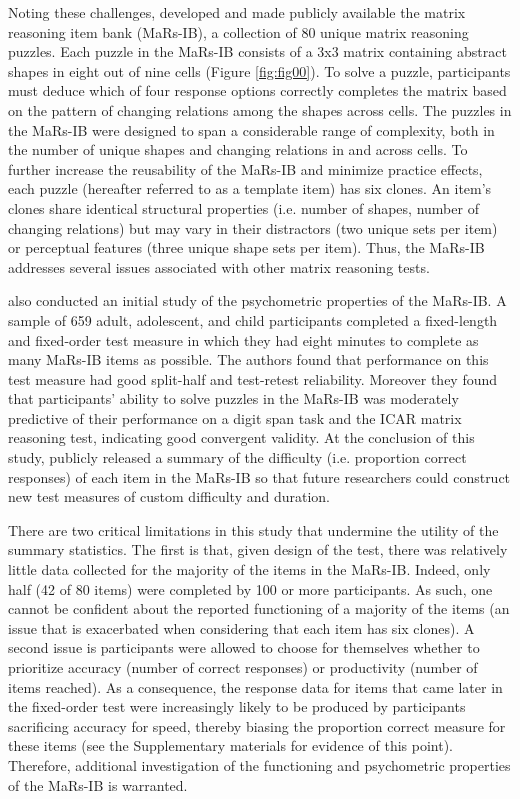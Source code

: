 \documentclass[a4paper,man,natbib]{apa6}
\begin{document}
Noting these challenges, \cite{knoll2016window} developed and  \cite{chierchia2019matrix} made publicly available the matrix reasoning item bank (MaRs-IB), a collection of 80 unique matrix reasoning puzzles. Each puzzle in the MaRs-IB consists of a 3x3 matrix containing abstract shapes in eight out of nine cells (Figure \ref{fig:fig00}). To solve a puzzle, participants must deduce which of four response options correctly completes the matrix based on the pattern of changing relations among the shapes across cells. The puzzles in the MaRs-IB were designed to span a considerable range of complexity, both in the number of unique shapes and changing relations in and across cells. To further increase the reusability of the MaRs-IB and minimize practice effects, each puzzle (hereafter referred to as a template item) has six clones. An item's clones share identical structural properties (i.e. number of shapes, number of changing relations) but may vary in their distractors (two unique sets per item) or perceptual features (three unique shape sets per item). Thus, the MaRs-IB addresses several issues associated with other matrix reasoning tests.   

\cite{chierchia2019matrix} also conducted an initial study of the psychometric properties of the MaRs-IB. A sample of 659 adult, adolescent, and child participants completed a fixed-length and fixed-order test measure in which they had eight minutes to complete as many MaRs-IB items as possible. The authors found that performance on this test measure had good split-half and test-retest reliability. Moreover they found that participants' ability to solve puzzles in the MaRs-IB was moderately predictive of their performance on a digit span task and the ICAR matrix reasoning test, indicating good convergent validity. At the conclusion of this study, \cite{chierchia2019matrix} publicly released a summary of the difficulty (i.e. proportion correct responses) of each item in the MaRs-IB so that future researchers could construct new test measures of custom difficulty and duration.

There are two critical limitations in this study that undermine the utility of the summary statistics. The first is that, given design of the test, there was relatively little data collected for the majority of the items in the MaRs-IB. Indeed, only half (42 of 80 items) were completed by 100 or more participants. As such, one cannot be confident about the reported functioning of a majority of the items (an issue that is exacerbated when considering that each item has six clones). A second issue is participants were allowed to choose for themselves whether to prioritize accuracy (number of correct responses) or productivity (number of items reached). As a consequence, the response data for items that came later in the fixed-order test were increasingly likely to be produced by participants sacrificing accuracy for speed, thereby biasing the proportion correct measure for these items (see the Supplementary materials for evidence of this point). Therefore, additional investigation of the functioning and psychometric properties of the MaRs-IB is warranted.
\end{document}
